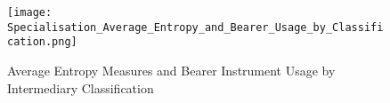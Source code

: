 \begin{figure}[htbp]
    \centering
    \texttt{[image: Specialisation\_Average\_Entropy\_and\_Bearer\_Usage\_by\_Classification.png]}
    \caption{Average Entropy Measures and Bearer Instrument Usage by Intermediary Classification}
    \label{fig:specialisation_average_entropy_bearer}
\end{figure}

